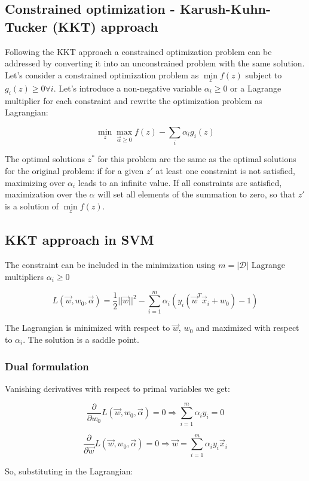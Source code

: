 	\subsection{Constrained optimization - Karush-Kuhn-Tucker (KKT) approach}
	Following the KKT approach a constrained optimization problem can be addressed by converting it into an unconstrained problem with the same solution.
	Let's consider a constrained optimization problem as $\min\limits_z f(z)$ subject to $g_i(z)\ge 0\forall i$.
	Let's introduce a non-negative variable $\alpha_i\ge 0$ or a Lagrange multiplier for each constraint and rewrite the optimization problem as Lagrangian:

	$$\min\limits_{z}\max\limits_{\vec{\alpha}\ge 0}f(z)-\sum\limits_i\alpha_ig_i(z)$$

	The optimal solutions $z^*$ for this problem are the same as the optimal solutions for the original problem: if for a given $z'$ at least one constraint is not satisfied, maximizing over $\alpha_i$ leads to an infinite value.
	If all constraints are satisfied, maximization over the $\alpha$ will set all elements of the summation to zero, so that $z'$ is a solution of $\min\limits_zf(z)$.

	\subsection{KKT approach in SVM}
	The constraint can be included in the minimization using $m=|\mathcal{D}|$ Lagrange multipliers $\alpha_i\ge 0$

	$$L(\vec{w}, w_0, \vec{\alpha}) = \frac{1}{2}||\vec{w}||^2-\sum\limits_{i=1}^m\alpha_i(y_i(\vec{w}^T\vec{x}_i+w_0)-1)$$

	The Lagrangian is minimized with respect to $\vec{w}$, $w_0$ and maximized with respect to $\alpha_i$.
	The solution is a saddle point.

		\subsubsection{Dual formulation}
		Vanishing derivatives with respect to primal variables we get:

		$$\frac{\partial}{\partial w_0}L(\vec{w}, w_0, \vec{\alpha}) = 0\Rightarrow \sum\limits_{i=1}^m\alpha_iy_i=0$$

		$$\frac{\partial}{\partial \vec{w}}L(\vec{w}, w_0, \vec{\alpha}) = 0\Rightarrow \vec{w}=\sum\limits_{i=1}^m\alpha_iy_i\vec{x}_i$$

		So, substituting in the Lagrangian:

